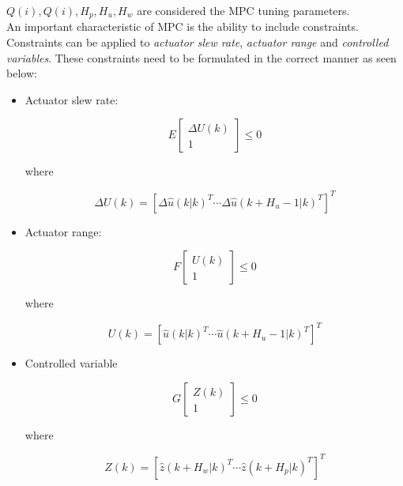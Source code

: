 $Q(i), Q(i), H_p, H_u, H_w$ are considered the MPC tuning parameters.\\

An important characteristic of MPC is the ability to include constraints. Constraints can be applied to \textit{actuator slew rate}, \textit{actuator range} and \textit{controlled variables}. These constraints need to be formulated in the correct manner as seen below:

\begin{itemize}
	\item Actuator slew rate:

	\begin{equation} \label{eq:mpc_const_sr}
		E \begin{bmatrix} \Delta U(k) \\ 1 \end{bmatrix} \le 0
	\end{equation}
	\begin{center} where \end{center}
	\begin{equation*}
		\Delta U(k) = [\Delta \hat{u}(k|k)^T \cdots \Delta \hat{u}(k+H_u-1|k)^T]^T
	\end{equation*}


	\item Actuator range:

	\begin{equation} \label{eq:mpc_const_ar}
		F \begin{bmatrix} U(k) \\ 1 \end{bmatrix} \le 0
	\end{equation}
	\begin{center} where \end{center}
	\begin{equation*}
		U(k) = [\hat{u}(k|k)^T \cdots \hat{u}(k+H_u-1|k)^T]^T
	\end{equation*}

	\item Controlled variable

	\begin{equation} \label{eq:mpc_const_cv}
		G \begin{bmatrix} Z(k) \\ 1 \end{bmatrix} \le 0
	\end{equation}
	\begin{center} where \end{center}
	\begin{equation*}
		Z(k) = [\hat{z}(k+H_w|k)^T \cdots \hat{z}(k+H_p|k)^T]^T
	\end{equation*}
\end{itemize}


